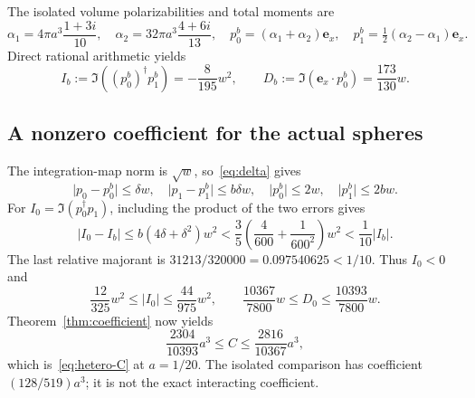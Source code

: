 \documentclass[11pt]{article}
\newcommand{\abs}[1]{\lvert #1\rvert}
\newcommand{\ex}{\mathbf e_x}
\begin{document}
The isolated volume polarizabilities and total moments are
\begin{equation}\label{eq:polarizabilities}
 \alpha_1=4\pi a^3\frac{1+3i}{10},\quad
 \alpha_2=32\pi a^3\frac{4+6i}{13},\quad
 p_0^b=(\alpha_1+\alpha_2)\ex,\quad
 p_1^b=\tfrac12(\alpha_2-\alpha_1)\ex.
\end{equation}
Direct rational arithmetic yields
\begin{equation}\label{eq:block-values}
 I_b:=\Im((p_0^b)^\dagger p_1^b)=-\frac8{195}w^2,
 \qquad D_b:=\Im(\ex\cdot p_0^b)=\frac{173}{130}w.
\end{equation}

\subsection{A nonzero coefficient for the actual spheres}
The integration-map norm is $\sqrt w$, so~\eqref{eq:delta} gives
\[
 \abs{p_0-p_0^b}\leq\delta w,\quad
 \abs{p_1-p_1^b}\leq b\delta w,\quad
 \abs{p_0^b}\leq2w,\quad\abs{p_1^b}\leq2bw.
\]
For $I_0=\Im(p_0^\dagger p_1)$, including the product of the two errors gives
\begin{equation}\label{eq:hetero-error}
 \abs{I_0-I_b}\leq b(4\delta+\delta^2)w^2
 <\frac35\left(\frac4{600}+\frac1{600^2}\right)w^2
 <\frac1{10}\abs{I_b}.
\end{equation}
The last relative majorant is $31213/320000=0.097540625<1/10$. Thus $I_0<0$ and
\begin{equation}\label{eq:moment-enclosure}
 \frac{12}{325}w^2\leq\abs{I_0}\leq\frac{44}{975}w^2,
 \qquad\frac{10367}{7800}w\leq D_0\leq\frac{10393}{7800}w.
\end{equation}
Theorem~\ref{thm:coefficient} now yields
\begin{equation}\label{eq:C-enclosure}
 \frac{2304}{10393}a^3\leq C\leq\frac{2816}{10367}a^3,
\end{equation}
which is~\eqref{eq:hetero-C} at $a=1/20$. The isolated comparison has coefficient $(128/519)a^3$; it is not the exact interacting coefficient.
\end{document}
